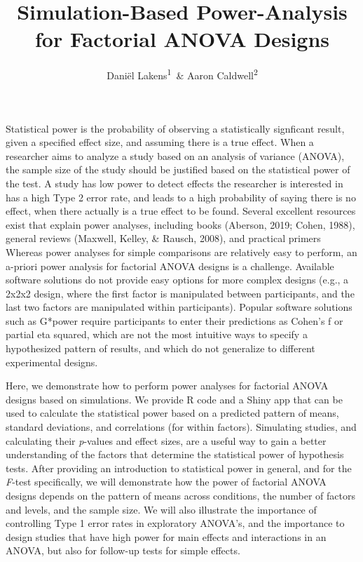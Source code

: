 \documentclass[,man,floatsintext]{apa6}
\title{Simulation-Based Power-Analysis for Factorial ANOVA Designs}
\author{Daniël Lakens\textsuperscript{1}~\& Aaron Caldwell\textsuperscript{2}}
\date{}
\affiliation{
\vspace{0.5cm}
\textsuperscript{1} Eindhoven University of Technology, The Netherlands\\\textsuperscript{2} Department of Health, Human Performance and Recreation, University of Arkansas, USA}
\begin{document}
\maketitle

Statistical power is the probability of observing a statistically
signficant result, given a specified effect size, and assuming there is
a true effect. When a researcher aims to analyze a study based on an
analysis of variance (ANOVA), the sample size of the study should be
justified based on the statistical power of the test. A study has low
power to detect effects the researcher is interested in has a high Type
2 error rate, and leads to a high probability of saying there is no
effect, when there actually is a true effect to be found. Several
excellent resources exist that explain power analyses, including books
(Aberson, 2019; Cohen, 1988), general reviews (Maxwell, Kelley, \&
Rausch, 2008), and practical primers Whereas power analyses for simple
comparisons are relatively easy to perform, an a-priori power analysis
for factorial ANOVA designs is a challenge. Available software solutions
do not provide easy options for more complex designs (e.g., a 2x2x2
design, where the first factor is manipulated between participants, and
the last two factors are manipulated within participants). Popular
software solutions such as G*power require participants to enter their
predictions as Cohen's f or partial eta squared, which are not the most
intuitive ways to specify a hypothesized pattern of results, and which
do not generalize to different experimental designs.

Here, we demonstrate how to perform power analyses for factorial ANOVA
designs based on simulations. We provide R code and a Shiny app that can
be used to calculate the statistical power based on a predicted pattern
of means, standard deviations, and correlations (for within factors).
Simulating studies, and calculating their \emph{p}-values and effect
sizes, are a useful way to gain a better understanding of the factors
that determine the statistical power of hypothesis tests. After
providing an introduction to statistical power in general, and for the
\emph{F}-test specifically, we will demonstrate how the power of
factorial ANOVA designs depends on the pattern of means across
conditions, the number of factors and levels, and the sample size. We
will also illustrate the importance of controlling Type 1 error rates in
exploratory ANOVA's, and the importance to design studies that have high
power for main effects and interactions in an ANOVA, but also for
follow-up tests for simple effects.
\end{document}
